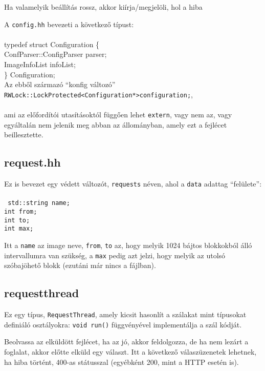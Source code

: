 \documentclass[fleqn,10pt,a4paper,titlepage]{article}
\begin{document}
  Ha valamelyik beállítás rossz, akkor kiírja/megjelöli, hol a hiba
  
  A \texttt{config.hh} bevezeti a következő típust:\\\\
  typedef struct Configuration \{\\
  \hspace*{5mm} ConfParser::ConfigParser parser;\\
  \hspace*{5mm}ImageInfoList infoList;\\
  \} Configuration;\\

  Az ebből származó ``konfig változó''\\
  
  \texttt{RWLock::LockProtected\textless Configuration*\textgreater  configuration;},\\\\
  ami az előfordítói utasításoktól függően lehet \texttt{extern}, vagy nem az, vagy egyáltalán nem jelenik meg abban az
  állományban, amely ezt a fejlécet beillesztette.

  \newpage
  \subsection{request.hh}
  Ez is bevezet egy védett változót, \texttt{requests} néven, ahol a \texttt{data} adattag ``felülete'':\\\\
  \texttt{
    std::string name;\\
    int from;\\
    int to;\\
    int max;\\
  }

  Itt a \texttt{name} az image neve, \texttt{from}, \texttt{to} az, hogy melyik 1024 bájtos blokkokból álló
  intervallumra van szükség, a \texttt{max} pedig azt jelzi, hogy melyik az utolsó szóbajöhető blokk (ezutáni már nincs
  a fájlban).

  \subsection{requestthread}
  Ez egy típus, \texttt{RequestThread}, amely kicsit hasonlít a szálakat mint típusokat definiáló osztályokra:
  \texttt{void run()} függvényével implementálja a szál kódját.
  
  Beolvassa az elküldött fejlécet, ha az jó, akkor feldolgozza, de ha nem lezárt a foglalat, akkor előtte elküld egy
  választ. Itt a következő válaszüzenetek lehetnek, ha hiba történt, 400-as státusszal (egyébként 200, mint a HTTP
  esetén is).
  
\end{document}
